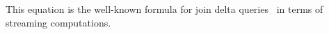 \begin{theorem}[Bilinear]
\begin{tabular}{m{3.3cm}m{0cm}m{4cm}}
\end{tabular}
\end{theorem}

This equation is the well-known formula for join delta
queries~\cite{koch-pods10} in terms of streaming computations.

